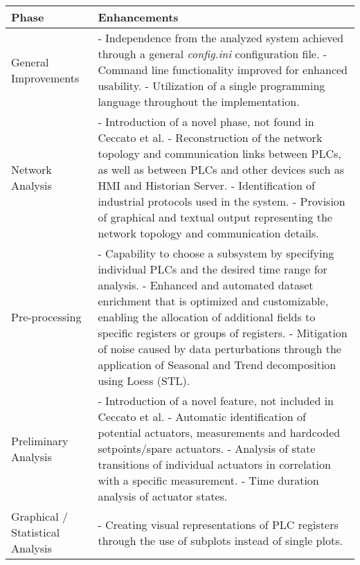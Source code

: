 \bigskip
{\small
	\begin{longtable}[c]{p{} p{}}
		\hline
		\textbf{Phase} & \textbf{Enhancements} \\ [0.5ex] 
		\hline
		General \newline Improvements & - Independence from the analyzed system achieved through a general \textit{config.ini} configuration file.\newline
		- Command line functionality improved for enhanced usability.\newline
		- Utilization of a single programming language throughout the implementation. \\
		\hline
		Network Analysis & - Introduction of a novel phase, not found in Ceccato et al.\newline
		- Reconstruction of the network topology and communication links between PLCs, as well as between PLCs and other devices such as HMI and Historian Server.\newline
		- Identification of industrial protocols used in the system.\newline
		- Provision of graphical and textual output representing the network topology and communication details.\\
		\hline
		Pre-processing & - Capability to choose a subsystem by specifying individual PLCs and the desired time range for analysis.\newline
		- Enhanced and automated dataset enrichment that is optimized and customizable, enabling the allocation of additional fields to specific registers or groups of registers.\newline
		- Mitigation of noise caused by data perturbations through the application of Seasonal and Trend decomposition using Loess (STL).\\
		\hline
		Preliminary \newline Analysis & - Introduction of a novel feature, not included in Ceccato et al.\newline
		- Automatic identification of potential actuators, measurements and hardcoded setpoints/spare actuators.\newline
		- Analysis of state transitions of individual actuators in correlation with a specific measurement.\newline
		- Time duration analysis of actuator states. \\
		\hline
		Graphical / \newline Statistical \newline Analysis & - Creating visual representations of PLC registers through the use of subplots instead of single plots.\newline

\end{longtable}}
